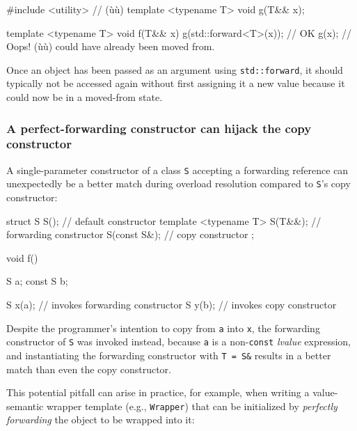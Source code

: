 \begin{emcppshiddenlisting}[emcppsbatch=e17]
#include <utility>      // (ù{}ù)
template <typename T>
void g(T&& x);
\end{emcppshiddenlisting}
\begin{emcppslisting}[emcppsbatch=e17]
template <typename T>
void f(T&& x)
{
    g(std::forward<T>(x));  // OK
    g(x);                   // Oops! (ù{}ù) could have already been moved from.
}
\end{emcppslisting}

\noindent Once an object has been passed as an argument using
\texttt{std::forward}, it should typically not be accessed again
without first assigning it a new value because it could now be in a
moved-from state.

\subsubsection[A perfect-forwarding constructor can hijack the copy constructor]{A perfect-forwarding constructor can hijack the copy constructor}\label{a-perfect-forwarding-constructor-can-hijack-the-copy-constructor}

A single-parameter constructor of a class \texttt{S} accepting a
forwarding reference can unexpectedly be a better match during overload
resolution compared to \texttt{S}'s copy constructor:

\begin{emcppslisting}
struct S
{
    S();                           // default constructor
    template <typename T> S(T&&);  // forwarding constructor
    S(const S&);                   // copy constructor
};

void f()
{
    S a;
    const S b;

    S x(a);  // invokes forwarding constructor
    S y(b);  // invokes copy constructor
}
\end{emcppslisting}

\noindent Despite the programmer's intention to copy from \texttt{a} into
\texttt{x}, the forwarding constructor of \texttt{S} was invoked
instead, because \texttt{a} is a non-\texttt{const} \emph{lvalue}
expression, and instantiating the forwarding constructor with
\texttt{T}~\texttt{=}~\texttt{S\&} results in a better match than even
the copy constructor.

This potential pitfall can arise in practice, for example, when writing
a value-semantic wrapper template (e.g., \texttt{Wrapper}) that can be
initialized by \textit{perfectly forwarding} the object to be wrapped into it:

